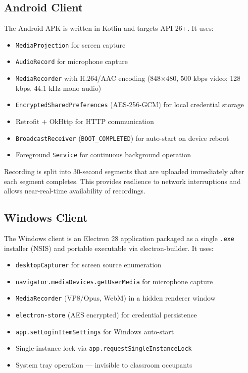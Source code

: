\documentclass[12pt,a4paper]{article}
\begin{document}
\subsection{Android Client}

The Android APK is written in Kotlin and targets API 26+. It uses:

\begin{itemize}
    \item \texttt{MediaProjection} for screen capture
    \item \texttt{AudioRecord} for microphone capture
    \item \texttt{MediaRecorder} with H.264/AAC encoding (848$\times$480, 500 kbps video; 128 kbps, 44.1 kHz mono audio)
    \item \texttt{EncryptedSharedPreferences} (AES-256-GCM) for local credential storage
    \item Retrofit + OkHttp for HTTP communication
    \item \texttt{BroadcastReceiver} (\texttt{BOOT\_COMPLETED}) for auto-start on device reboot
    \item Foreground \texttt{Service} for continuous background operation
\end{itemize}

Recording is split into 30-second segments that are uploaded immediately after each segment completes. This provides resilience to network interruptions and allows near-real-time availability of recordings.

\subsection{Windows Client}

The Windows client is an Electron 28 application packaged as a single \texttt{.exe} installer (NSIS) and portable executable via electron-builder. It uses:

\begin{itemize}
    \item \texttt{desktopCapturer} for screen source enumeration
    \item \texttt{navigator.mediaDevices.getUserMedia} for microphone capture
    \item \texttt{MediaRecorder} (VP8/Opus, WebM) in a hidden renderer window
    \item \texttt{electron-store} (AES encrypted) for credential persistence
    \item \texttt{app.setLoginItemSettings} for Windows auto-start
    \item Single-instance lock via \texttt{app.requestSingleInstanceLock}
    \item System tray operation — invisible to classroom occupants
\end{itemize}
\end{document}
